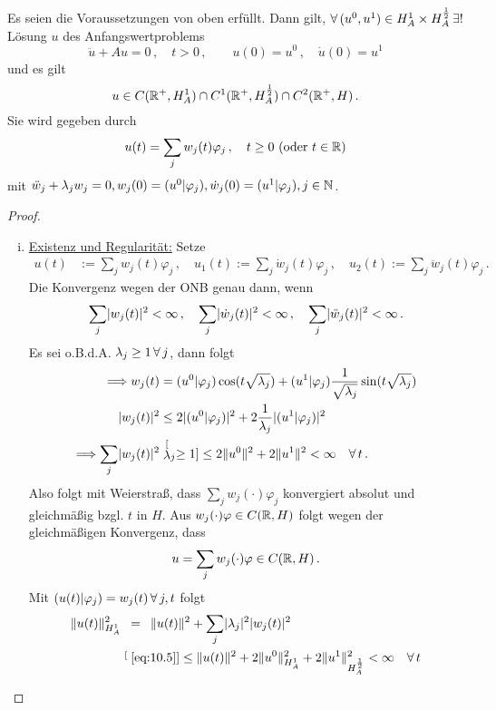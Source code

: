 \begin{theorem}
\label{theorem:10.13}
Es seien die Voraussetzungen von oben erfüllt. Dann gilt, $\forall \, (u^0,u^1)\in H^1_A \times H^{\frac 12 }_A \, \exists!$ Lösung $u$ des Anfangswertproblems
\[
	\ddot u + A u = 0 \, , \quad t > 0 \, , \qquad u(0) = u^0 \, , \quad \dot u (0) = u^1
\]
und es gilt
\[
	u \in C(\mathbb{R}^+,H^1_A) \cap C^1(\mathbb{R}^+,H_A^{\frac 12})\cap C^2(\mathbb{R}^+,H) \, .
\]
Sie wird gegeben durch
\[
	u(t) = \sum_j w_j(t) \varphi_j \, , \quad t \geq 0 \ (\text{oder } t \in \mathbb{R})
\]
mit $\ddot w_j + \lambda_j w_j = 0, w_j(0) = (u^0|\varphi_j),\dot w_j(0) = (u^1|\varphi_j), j \in \mathbb{N}$.
\end{theorem}

\begin{proof}
\begin{enumerate}[(i)]
\item \underline{Existenz und Regularität:} Setze
\begin{align*}
	u(t) & := \sum_j w_j(t) \varphi_j \, , \quad
	u_1(t)  := \sum_j \dot w_j(t) \varphi_j \, , \quad
	u_2(t)  := \sum_j \ddot w_j(t) \varphi_j\, .
\end{align*}
Die Konvergenz wegen der ONB genau dann, wenn
\[
	\sum_j \lvert w_j(t)\rvert^2 < \infty \, , \quad \sum_j \lvert \dot w_j(t)\rvert^2 <\infty \, , \quad \sum_j \lvert \ddot w_j(t)\rvert^2 <\infty \, . 
\]
Es sei o.B.d.A. $\lambda_j \geq 1 \, \forall \, j$, dann folgt
\begin{align}\label{eq:10.5}
	\Longrightarrow w_j (t) & = (u^0|\varphi_j) \cos (t\sqrt{\lambda_j}) + (u^1 |\varphi_j) \frac 1{\sqrt{\lambda_j}} \sin(t\sqrt{\lambda_j}) \notag \\
	\lvert w_j(t)\rvert^2 & \leq 2 \lvert (u^0|\varphi_j)\rvert^2 + 2 \frac 1{\lambda_j} \lvert (u^1|\varphi_j)\rvert^2 \\
	\Longrightarrow \sum_j \lvert w_j(t)\rvert^2 & \stackrel[\lambda_j\geq 1]{}\leq 2\lVert u^0\rVert^2 + 2 \lVert u^1\rVert^2 < \infty \quad \forall \, t \notag \, .
\end{align}
Also folgt mit Weierstraß, dass $\sum_j w_j(\cdot) \varphi_j$ konvergiert absolut und gleichmäßig bzgl. $t$ in $H$. Aus $w_j(\cdot) \varphi \in C(\mathbb{R}, H)$ folgt wegen der gleichmäßigen Konvergenz, dass
\[
	u  = \sum_j w_j(\cdot) \varphi \in C(\mathbb{R},H) \, .
\]
Mit $(u(t)|\varphi_j) = w_j(t) \, \forall \, j,t$ folgt
\begin{align*}
	\norm{u(t)}^2_{H_A^1} & \, \,\,  =\, \, \,  \norm{u(t)}^2 + \sum_j \abs{\lambda_j}^2 \abs{w_j(t)}^2 \\
	&\stackrel[\scriptsize\eqref{eq:10.5}]{}\leq \norm{u(t)}^2 + 2\norm{u^0}^2_{H_A^1} + 2\norm{u^1}^2_{H_A^{\frac 12}} < \infty \quad \fa \, t

\end{align*}
\end{enumerate}
\end{proof}
